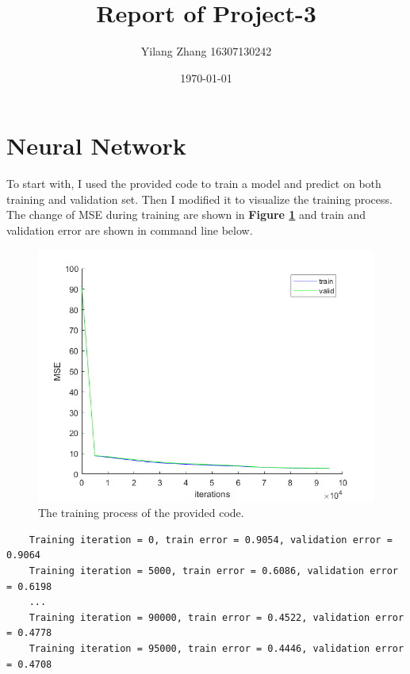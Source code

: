 \documentclass{article}
\title{Report of Project-3} %
\author{Yilang Zhang 16307130242} %
\date{\today} %
\begin{document}
	
\maketitle %


\section{Neural Network} %

To start with, I used the provided code to train a model and predict on both training and validation set. Then I modified it to visualize the training process. The change of MSE during training are shown in \textbf{Figure \ref{fig1}} and train and validation error are shown in command line below.

\begin{figure}[H]
	\centering
	\includegraphics[scale=0.5]{figure1}
	\caption{The training process of the provided code.}
	\label{fig1}
\end{figure}

\begin{commandline}
	\begin{verbatim}
	Training iteration = 0, train error = 0.9054, validation error = 0.9064
	Training iteration = 5000, train error = 0.6086, validation error = 0.6198
	...
	Training iteration = 90000, train error = 0.4522, validation error = 0.4778
	Training iteration = 95000, train error = 0.4446, validation error = 0.4708
	\end{verbatim}
\end{commandline}
\end{document}
